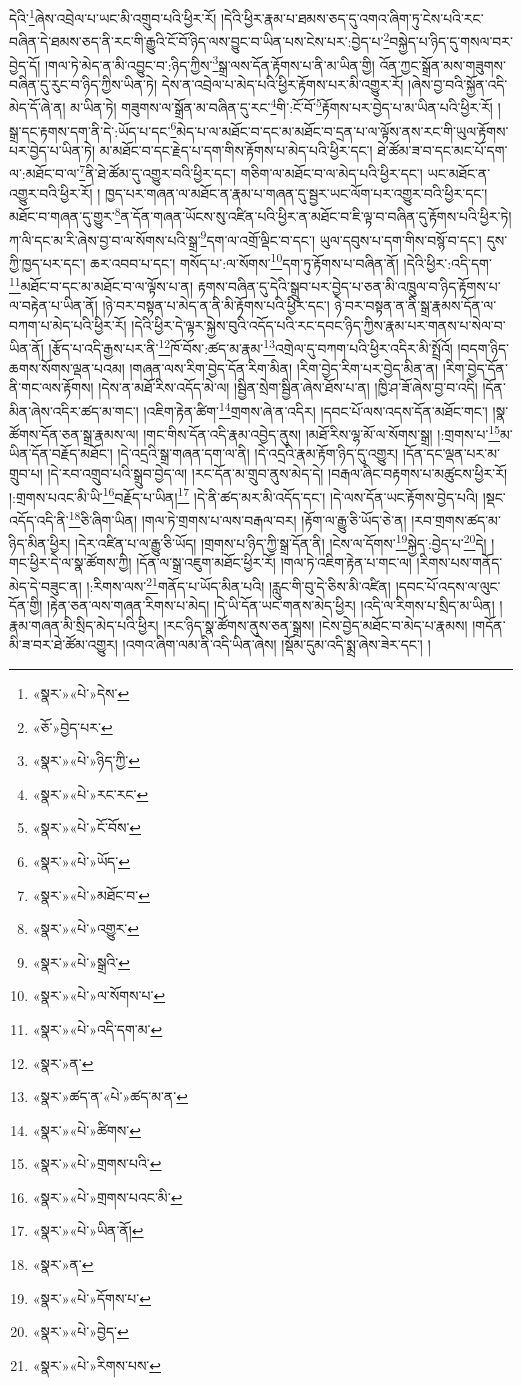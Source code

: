 དེའི་\footnote{«སྣར་»«པེ་»དེས་}ཞེས་འབྲེལ་པ་ཡང་མི་འགྲུབ་པའི་ཕྱིར་རོ། །དེའི་ཕྱིར་རྣམ་པ་ཐམས་ཅད་དུ་འགའ་ཞིག་ཏུ་ངེས་པའི་རང་བཞིན་དེ་ཐམས་ཅད་ནི་རང་གི་རྒྱུའི་ངོ་བོ་ཉིད་ལས་བྱུང་བ་ཡིན་པས་ངེས་པར་:བྱེད་པ་\footnote{«ཅོ་»བྱེད་པར་}བསྐྱེད་པ་ཉིད་དུ་གསལ་བར་བྱེད་དོ། །གལ་ཏེ་མེད་ན་མི་འབྱུང་བ་:ཉིད་ཀྱིས་\footnote{«སྣར་»«པེ་»ཉིད་ཀྱི་}སྒྲ་ལས་དོན་རྟོགས་པ་ནི་མ་ཡིན་གྱི། འོན་ཀྱང་སྒྲོན་མས་གཟུགས་བཞིན་དུ་རུང་བ་ཉིད་ཀྱིས་ཡིན་ཏེ། དེས་ན་འབྲེལ་པ་མེད་པའི་ཕྱིར་རྟོགས་པར་མི་འགྱུར་རོ། །ཞེས་བྱ་བའི་སྐྱོན་འདི་མེད་དོ་ཞེ་ན། མ་ཡིན་ཏེ། གཟུགས་ལ་སྒྲོན་མ་བཞིན་དུ་རང་\footnote{«སྣར་»«པེ་»རང་རང་}གི་:ངོ་བོ་\footnote{«སྣར་»«པེ་»ངོ་བོས་}རྟོགས་པར་བྱེད་པ་མ་ཡིན་པའི་ཕྱིར་རོ། །སྒྲ་དང་རྟགས་དག་ནི་དེ་:ཡོད་པ་དང་\footnote{«སྣར་»«པེ་»ཡོད་}མེད་པ་ལ་མཐོང་བ་དང་མ་མཐོང་བ་དྲན་པ་ལ་ལྟོས་ནས་རང་གི་ཡུལ་རྟོགས་པར་བྱེད་པ་ཡིན་ཏེ། མ་མཐོང་བ་དང་རྗེད་པ་དག་གིས་རྟོགས་པ་མེད་པའི་ཕྱིར་དང་། ཐེ་ཚོམ་ཟ་བ་དང་མང་པོ་དག་ལ་:མཐོང་བ་ལ་\footnote{«སྣར་»«པེ་»མཐོང་བ་}ནི་ཐེ་ཚོམ་དུ་འགྱུར་བའི་ཕྱིར་དང་། གཅིག་ལ་མཐོང་བ་ལ་མེད་པའི་ཕྱིར་དང་། ཡང་མཐོང་ན་འགྱུར་བའི་ཕྱིར་རོ། །
ཁྱད་པར་གཞན་ལ་མཐོང་ན་རྣམ་པ་གཞན་དུ་སྦྱར་ཡང་ལོག་པར་འགྱུར་བའི་ཕྱིར་དང་། མཐོང་བ་གཞན་དུ་གྱུར་\footnote{«སྣར་»«པེ་»འགྱུར་}ན་དོན་གཞན་ཡོངས་སུ་འཛིན་པའི་ཕྱིར་ན་མཐོང་བ་ཇི་ལྟ་བ་བཞིན་དུ་རྟོགས་པའི་ཕྱིར་ཏེ། ཀ་ལི་དང་མ་རི་ཞེས་བྱ་བ་ལ་སོགས་པའི་སྒྲ་\footnote{«སྣར་»«པེ་»སྒྲའི་}དག་ལ་འགྲོ་ལྡིང་བ་དང་། ཡུལ་དབུས་པ་དག་གིས་བསྙོ་བ་དང་། དུས་ཀྱི་ཁྱད་པར་དང་། ཆར་འབབ་པ་དང་། གསོད་པ་:ལ་སོགས་\footnote{«སྣར་»«པེ་»ལ་སོགས་པ་}དག་ཏུ་རྟོགས་པ་བཞིན་ནོ། །དེའི་ཕྱིར་:འདི་དག་\footnote{«སྣར་»«པེ་»འདི་དག་མ་}མཐོང་བ་དང་མ་མཐོང་བ་ལ་ལྟོས་པ་ན། རྟགས་བཞིན་དུ་དེའི་སྒྲུབ་པར་བྱེད་པ་ཅན་མི་འཁྲུལ་བ་ཉིད་རྟོགས་པ་ལ་བརྟེན་པ་ཡིན་ནོ། །ཉེ་བར་བསྟན་པ་མེད་ན་ནི་མི་རྟོགས་པའི་ཕྱིར་དང་། ཉེ་བར་བསྟན་ན་ནི་སྒྲ་རྣམས་དོན་ལ་བཀག་པ་མེད་པའི་ཕྱིར་རོ། །དེའི་ཕྱིར་དེ་ལྟར་སྐྱེས་བུའི་འདོད་པའི་རང་དབང་ཉིད་ཀྱིས་རྣམ་པར་གནས་པ་སེལ་བ་ཡིན་ནོ། །རྩོད་པ་འདི་རྒྱས་པར་ནི་\footnote{«སྣར་»ན་}ཁོ་བོས་:ཚད་མ་རྣམ་\footnote{«སྣར་»ཚད་ན་«པེ་»ཚད་མ་ན་}འགྲེལ་དུ་བཀག་པའི་ཕྱིར་འདིར་མི་སྤྲོའོ། །བདག་ཉིད་ཆགས་སོགས་ལྡན་པའམ། །གཞན་ལས་རིག་བྱེད་དོན་རིག་མིན། །རིག་བྱེད་རིག་པར་བྱེད་མིན་ན། །རིག་བྱེད་དོན་ནི་གང་ལས་རྟོགས། །དེས་ན་མཐོ་རིས་འདོད་མེ་ལ། །སྦྱིན་སྲེག་སྦྱིན་ཞེས་ཐོས་པ་ན། །ཁྱི་ཤ་ཟོ་ཞེས་བྱ་བ་འདི། །དོན་མིན་ཞེས་འདིར་ཚད་མ་གང་། །འཇིག་རྟེན་ཚིག་\footnote{«སྣར་»«པེ་»ཚིགས་}གྲགས་ཞེ་ན་འདིར། །དབང་པོ་ལས་འདས་དོན་མཐོང་གང་། །སྣ་ཚོགས་དོན་ཅན་སྒྲ་རྣམས་ལ། །གང་གིས་དོན་འདི་རྣམ་འབྱེད་ནུས། །མཐོ་རིས་ལྷ་མོ་ལ་སོགས་སྒྲ། །:གྲགས་པ་\footnote{«སྣར་»«པེ་»གྲགས་པའི་}མ་ཡིན་དོན་བརྗོད་མཐོང་། །དེ་འདྲའི་སྒྲ་གཞན་དག་ལ་ནི། །དེ་འདྲའི་རྣམ་རྟོག་ཉིད་དུ་འགྱུར། །དོན་དང་ལྡན་པར་མ་གྲུབ་པ། །དེ་རབ་འགྲུབ་པའི་སྒྲུབ་བྱེད་ལ། །རང་དོན་མ་གྲུབ་ནུས་མེད་དེ། །བརྒལ་ཞིང་བརྟགས་པ་མཚུངས་ཕྱིར་རོ། །:གྲགས་པའང་མི་ཡི་\footnote{«སྣར་»«པེ་»གྲགས་པའང་མི་}བརྗོད་པ་ཡིན།\footnote{«སྣར་»«པེ་»ཡིན་ནོ།} །དེ་ནི་ཚད་མར་མི་འདོད་དང་། །དེ་ལས་དོན་ཡང་རྟོགས་བྱེད་པའི། །སྡང་འདོད་འདི་ནི་\footnote{«སྣར་»ན་}ཅི་ཞིག་ཡིན། །གལ་ཏེ་གྲགས་པ་ལས་བརྒལ་བར། །རྟོག་ལ་རྒྱུ་ཅི་ཡོད་ཅེ་ན། །རབ་གྲགས་ཚད་མ་ཉིད་མིན་ཕྱིར། །དེར་འཛིན་པ་ལ་རྒྱུ་ཅི་ཡོད། །གྲགས་པ་ཉིད་ཀྱི་སྒྲ་དོན་ནི། །ངེས་ལ་དོགས་\footnote{«སྣར་»«པེ་»དོགས་པ་}སྐྱེད་:བྱེད་པ་\footnote{«སྣར་»«པེ་»བྱེད་}དེ། །གང་ཕྱིར་དེ་ལ་སྣ་ཚོགས་ཀྱི། །དོན་ལ་སྒྲ་འཇུག་མཐོང་ཕྱིར་རོ། །གལ་ཏེ་འཇིག་རྟེན་པ་གང་ལ། །རིགས་པས་གནོད་མེད་དེ་བཟུང་ན། །:རིགས་ལས་\footnote{«སྣར་»«པེ་»རིགས་པས་}གནོད་པ་ཡོད་མིན་པའི། །རླུང་གི་བུ་དེ་ཅིས་མི་འཛིན། །དབང་པོ་འདས་ལ་ལུང་དོན་གྱི། །རྟེན་ཅན་ལས་གཞན་རིགས་པ་མེད། །དེ་ཡི་དོན་ཡང་གནས་མེད་ཕྱིར། །འདི་ལ་རིགས་པ་སྲིད་མ་ཡིན། །རྣམ་གཞན་མི་སྲིད་མེད་པའི་ཕྱིར། །རང་ཉིད་སྣ་ཚོགས་ནུས་ཅན་སྒྲས། །ངེས་བྱེད་མཐོང་བ་མེད་པ་རྣམས། །གདོན་མི་ཟ་བར་ཐེ་ཚོམ་འགྱུར། །འགའ་ཞིག་ལམ་ནི་འདི་ཡིན་ཞེས། །སྡོམ་དུམ་འདི་སྨྲ་ཞེས་ཟེར་དང་། །
